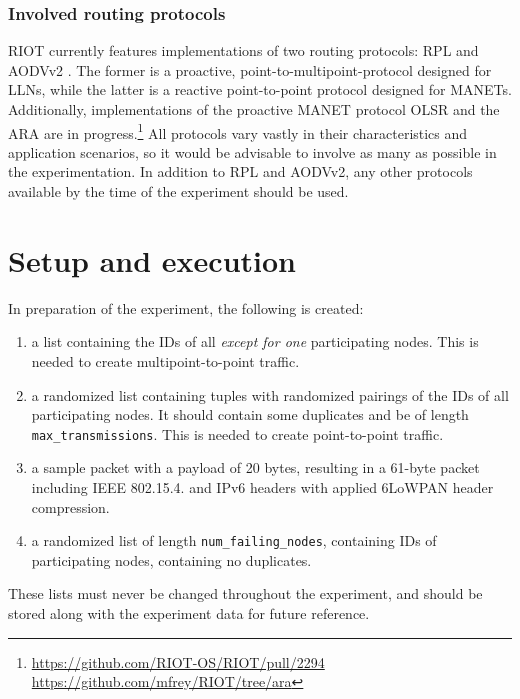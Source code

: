 \documentclass{acm_proc_article-sp}
\begin{document}
\subsubsection{Involved routing protocols}
\label{subsec:protocols}
RIOT currently features implementations of two routing protocols: RPL \cite{RFC-6550} and AODVv2 \cite{draft-ietf-manet-aodvv2-09}. The former is a proactive, point-to-multipoint-protocol designed for \glspl{LLN}, while the latter is a reactive point-to-point protocol designed for \glspl{MANET}. Additionally, implementations of the proactive \gls{MANET} protocol OLSR\cite{RFC-3626} and the \gls{ARA}\cite{ara} are in progress.\footnote{ \url{https://github.com/RIOT-OS/RIOT/pull/2294}\\  \url{https://github.com/mfrey/RIOT/tree/ara}}
All protocols vary vastly in their characteristics and application scenarios, so it would be advisable to involve as many as possible in the experimentation. In addition to RPL and AODVv2, any other protocols available by the time of the experiment should be used.

\section{Setup and execution}
\label{sec:setup}
In preparation of the experiment, the following is created:
\begin{enumerate}
\item a list containing the IDs of all \emph{except for one} participating nodes. This is needed to create multipoint-to-point traffic.
\item a randomized list containing tuples with randomized pairings of the IDs of all participating nodes. It should contain some duplicates and be of length \texttt{max\_transmissions}. This is needed to create point-to-point traffic.
\item a sample packet with a payload of 20 bytes, resulting in a 61-byte packet including IEEE 802.15.4. and IPv6 headers with applied 6LoWPAN header compression.
\item a randomized list of length \texttt{num\_failing\_nodes}, containing IDs of participating nodes, containing no duplicates.
\end{enumerate}
These lists must never be changed throughout the experiment, and should be stored along with the experiment data for future reference.\\
\end{document}
